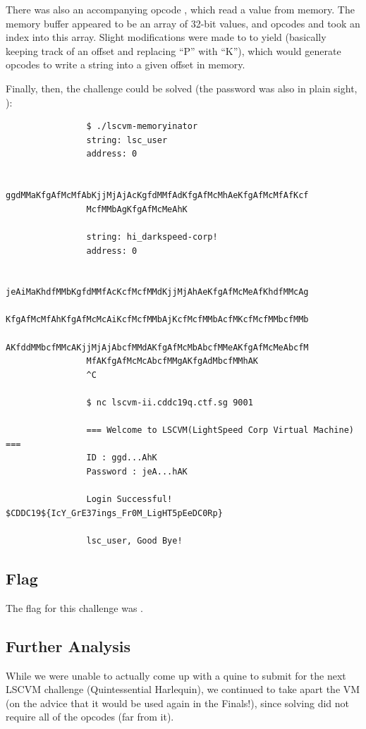 		There was also an accompanying opcode , which read a value from memory. The memory buffer appeared to be an array of 32-bit
		values, and opcodes  and  took an index into this array. Slight modifications were made to 
		to yield  (basically keeping track of an offset and replacing \enquote{P} with \enquote{K}), which would
		generate opcodes to write a string into a given offset in memory.

		\pagebreak
		Finally, then, the challenge could be solved (the password was also in plain sight, ):

		\begin{listing}[!htbp]
			\begin{verbatim}
				$ ./lscvm-memoryinator
				string: lsc_user
				address: 0

				ggdMMaKfgAfMcMfAbKjjMjAjAcKgfdMMfAdKfgAfMcMhAeKfgAfMcMfAfKcf
				McfMMbAgKfgAfMcMeAhK

				string: hi_darkspeed-corp!
				address: 0

				jeAiMaKhdfMMbKgfdMMfAcKcfMcfMMdKjjMjAhAeKfgAfMcMeAfKhdfMMcAg
				KfgAfMcMfAhKfgAfMcMcAiKcfMcfMMbAjKcfMcfMMbAcfMKcfMcfMMbcfMMb
				AKfddMMbcfMMcAKjjMjAjAbcfMMdAKfgAfMcMbAbcfMMeAKfgAfMcMeAbcfM
				MfAKfgAfMcMcAbcfMMgAKfgAdMbcfMMhAK
				^C

				$ nc lscvm-ii.cddc19q.ctf.sg 9001

				=== Welcome to LSCVM(LightSpeed Corp Virtual Machine) ===
				ID : ggd...AhK
				Password : jeA...hAK

				Login Successful! $CDDC19${IcY_GrE37ings_Fr0M_LigHT5pEeDC0Rp}

				lsc_user, Good Bye!
			\end{verbatim}
		\end{listing}



	\subsection{Flag}
		The flag for this challenge was .


	\subsection{Further Analysis}
		While we were unable to actually come up with a quine to submit for the next LSCVM challenge (Quintessential Harlequin), we
		continued to take apart the VM (on the advice that it would be used again in the Finals!), since solving  did
		not require all of the opcodes (far from it).


